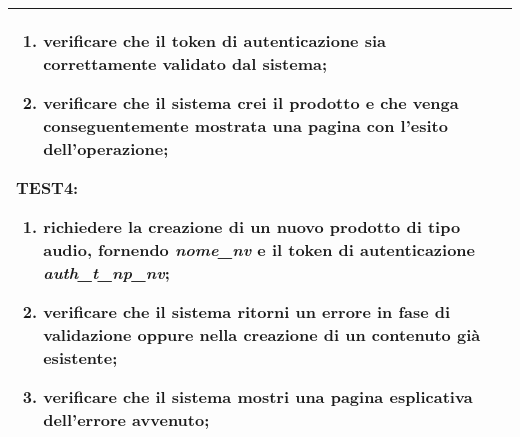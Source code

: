 \begin{table}[hb]
\begin{tabular}{ |p{2cm}|p{10cm}|  }
\begin{enumerate}[nosep, topsep=0pt]
            \item verificare che il token di autenticazione sia correttamente validato dal sistema;
            \item verificare che il sistema crei il prodotto e che venga conseguentemente mostrata una pagina con l'esito dell'operazione;
        \end{enumerate}
        \vspace{0.5cm} TEST4:
        \begin{enumerate}[nosep, topsep=0pt]
            \item richiedere la creazione di un nuovo prodotto di tipo audio, fornendo \emph{nome\_nv} e il token di autenticazione \emph{auth\_t\_np\_nv};
            \item verificare che il sistema ritorni un errore in fase di validazione oppure nella creazione di un contenuto già esistente;
            \item verificare che il sistema mostri una pagina esplicativa dell'errore avvenuto;
        \end{enumerate}
        \\\hline
    \end{tabular}
\end{table}

